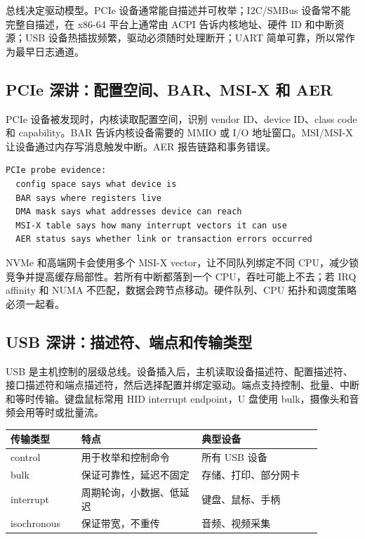 总线决定驱动模型。PCIe 设备通常能自描述并可枚举；I2C/SMBus 设备常不能完整自描述，在 x86-64 平台上通常由 ACPI 告诉内核地址、硬件 ID 和中断资源；USB 设备热插拔频繁，驱动必须随时处理断开；UART 简单可靠，所以常作为最早日志通道。

\subsection{PCIe 深讲：配置空间、BAR、MSI-X 和 AER}

PCIe 设备被发现时，内核读取配置空间，识别 vendor ID、device ID、class code 和 capability。BAR 告诉内核设备需要的 MMIO 或 I/O 地址窗口。MSI/MSI-X 让设备通过内存写消息触发中断。AER 报告链路和事务错误。

\begin{lstlisting}
PCIe probe evidence:
  config space says what device is
  BAR says where registers live
  DMA mask says what addresses device can reach
  MSI-X table says how many interrupt vectors it can use
  AER status says whether link or transaction errors occurred
\end{lstlisting}

NVMe 和高端网卡会使用多个 MSI-X vector，让不同队列绑定不同 CPU，减少锁竞争并提高缓存局部性。若所有中断都落到一个 CPU，吞吐可能上不去；若 IRQ affinity 和 NUMA 不匹配，数据会跨节点移动。硬件队列、CPU 拓扑和调度策略必须一起看。

\subsection{USB 深讲：描述符、端点和传输类型}

USB 是主机控制的层级总线。设备插入后，主机读取设备描述符、配置描述符、接口描述符和端点描述符，然后选择配置并绑定驱动。端点支持控制、批量、中断和等时传输。键盘鼠标常用 HID interrupt endpoint，U 盘使用 bulk，摄像头和音频会用等时或批量流。

\begin{longtable}{p{0.2\linewidth}p{0.34\linewidth}p{0.34\linewidth}}
\toprule
传输类型 & 特点 & 典型设备 \\
\midrule
control & 用于枚举和控制命令 & 所有 USB 设备 \\
bulk & 保证可靠性，延迟不固定 & 存储、打印、部分网卡 \\
interrupt & 周期轮询，小数据、低延迟 & 键盘、鼠标、手柄 \\
isochronous & 保证带宽，不重传 & 音频、视频采集 \\
\bottomrule
\end{longtable}

